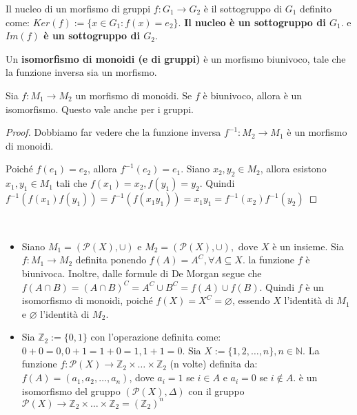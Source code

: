\documentclass[../main.tex]{subfiles}
\begin{document}
\begin{remark}
    Il nucleo di un morfismo di gruppi $f: G_1 \rightarrow G_2$ è il sottogruppo di $G_1$ definito come: $Ker(f):= \{x \in G_1 : f(x) = e_2\}$.
    \textbf{Il nucleo è un sottogruppo di $G_1$}. e \textbf{$Im(f)$ è un sottogruppo di $G_2$}.
\end{remark}

\begin{definition}[Isomorfismo]
    Un \textbf{isomorfismo di monoidi (e di gruppi)} è un morfismo biunivoco, tale che la funzione inversa sia un morfismo.
\end{definition}

\begin{proposition}
    Sia $f: M_1 \rightarrow M_2$ un morfismo di monoidi. Se $f$ è biunivoco, allora è un isomorfismo. Questo vale anche per i gruppi.
\end{proposition}

\begin{proof}
    Dobbiamo far vedere che la funzione inversa $f^{-1} : M_2 \rightarrow M_1$ è un morfismo di monoidi.

    Poiché $f(e_1) = e_2$, allora $f^{-1}(e_2) = e_1$.
    Siano $x_2,y_2 \in M_2$, allora esistono $x_1,y_1 \in M_1$ tali che $f(x_1)= x_2 , f(y_1)=y_2$.
    Quindi $f^{-1} (f(x_1)f(y_1)) = f^{-1}(f(x_1 y_1)) = x_1 y_1 = f^{-1}(x_2) f^{-1}(y_2)$
\end{proof}

\begin{example}
    \
    \begin{itemize}
        \item Siano $M_1 = (\mathcal{P}(X), \cup) \text{ e } M_2 = (\mathcal{P}(X), \cup), \text{ dove } X$
              è un insieme. Sia $f : M_1 \rightarrow M_2$ definita ponendo $f(A) = A^C , \forall A \subseteq X$.
              la funzione $f$ è biunivoca. Inoltre, dalle formule di De Morgan segue che $f(A \cap B) =
                  (A \cap B)^C = A^C \cup B^C = f(A) \cup f(B)$. Quindi $f$ è un isomorfismo di monoidi, poiché
              $f(X) = X^C = \varnothing$, essendo $X$ l'identità di $M_1$ e $\varnothing$ l'identità di $M_2$.
        \item Sia $\mathbb{Z}_2 := \{0,1\}$ con l'operazione definita come: $0+0=0, 0+1=1+0=1, 1+1=0$.
              Sia $X := \{1,2,\ldots,n\}, n \in \mathbb{N}$. La funzione $f: \mathcal{P}(X) \rightarrow
                  \mathbb{Z}_2 \times \ldots \times \mathbb{Z}_2$ (n volte) definita da: $f(A) = (a_1,a_2,\ldots,a_n)$,
              dove $a_i = 1$ se $i \in A$ e $a_i = 0$ se $i \notin A$. \newline è un isomorfismo del gruppo
              $(\mathcal{P}(X), \Delta)$ con il gruppo $\mathcal{P}(X) \rightarrow \mathbb{Z}_2 \times \ldots
                  \times \mathbb{Z}_2 = (\mathbb{Z}_2)^n$
    \end{itemize}
\end{example}
\end{document}
